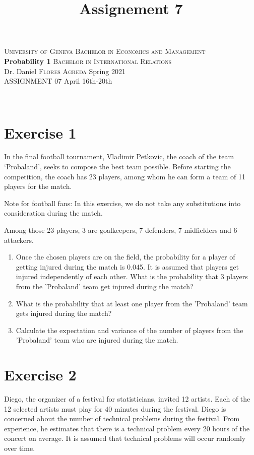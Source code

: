 \documentclass[12pt,thmsa]{article}\usepackage[]{graphicx}\usepackage[]{color}
\title{Assignement 7}
\begin{document}
\noindent \textsc{University of Geneva}     \hfill \textsc{Bachelor in Economics and Management} \\
\textbf{Probability 1}                      \hfill \textsc{Bachelor in International Relations} \\
Dr. Daniel \textsc{Flores Agreda}                 \hfill Spring 2021  \\
ASSIGNMENT 07                               \hfill   April 16th-20th



\noindent
\makebox[\linewidth]{\rule{\textwidth}{0.4pt}}\\[1.5ex]


\section*{Exercise 1}

In the final football tournament, Vladimir Petkovic, the coach of the team `Probaland', seeks to compose the best team possible. Before starting the competition, the coach has 23 players, among whom he can form a team of 11 players for the match.
\medskip


Note for football fans: In this exercise, we do not take any substitutions into consideration during the match.
\medskip

Among those 23 players, 3 are goalkeepers, 7 defenders, 7 midfielders and 6 attackers.
\begin{enumerate}
\item Once the chosen players are on the field, the probability for a player of getting injured during the match is 0.045. It is assumed that players get injured
independently of each other. What is the probability that 3 players from the 'Probaland' team get injured during the match?
\item What is the probability that at least one player from the 'Probaland' team gets injured during the match?
\item Calculate the expectation and variance of the number of players from the 'Probaland' team who are injured during the match.
\end{enumerate}




\section*{Exercise 2}
Diego, the organizer of a festival for statisticians, invited 12 artists. Each of the 12 selected artists must play for 40 minutes during the festival. Diego is concerned about the number of technical problems during the festival. From experience, he estimates that there is a technical problem every 20 hours of the concert on average. It is assumed that technical problems will occur randomly over time.
\end{document}
